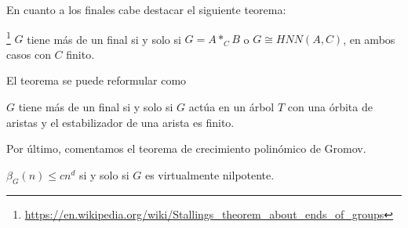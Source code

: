 \documentclass[twoside, 11pt]{article}
\begin{document}
En cuanto a los finales cabe destacar el siguiente teorema:
\begin{teorema}[Stallings]\footnote{\url{https://en.wikipedia.org/wiki/Stallings_theorem_about_ends_of_groups}}
$G$ tiene más de un final si y solo si $G=A*_C B$ o $G\cong HNN(A,C)$, en ambos casos con $C$ finito. 
\end{teorema}

El teorema se puede reformular como
\begin{teorema}
$G$ tiene más de un final si y solo si $G$ actúa en un árbol $T$ con una órbita de aristas y el estabilizador de una arista es finito.
\end{teorema}

Por último, comentamos el teorema de crecimiento polinómico de Gromov. 
\begin{teorema}
$\beta_G(n)\leq cn^d$ si y solo si $G$ es virtualmente nilpotente. 
\end{teorema}
\end{document}
